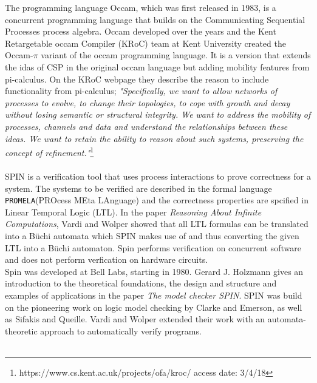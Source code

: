 \documentclass[a4paper]{report}
\begin{document}
The programming language Occam, which was first released in 1983, is a concurrent programming language that builds on the Communicating Sequential Processes process algebra. Occam developed over the years and the Kent Retargetable occam Compiler (KRoC) team at Kent University created the Occam-$\pi$ variant of the occam programming language. It is a version that extends the idas of CSP in the original occam language but adding mobility features from pi-calculus. On the KRoC webpage they describe the reason to include functionality from pi-calculus; \textit{"Specifically, we want to allow networks of processes to evolve, to change their topologies, to cope with growth and decay without losing semantic or structural integrity. We want to address the mobility of processes, channels and data and understand the relationships between these ideas. We want to retain the ability to reason about such systems, preserving the concept of refinement."}\footnote{https://www.cs.kent.ac.uk/projects/ofa/kroc/ access date: 3/4/18}\\\\

SPIN\cite{spin} is a verification tool that uses process interactions to prove correctness for a system. The systems to be verified are described in the formal language \texttt{PROMELA}(PROcess MEta LAnguage)\cite{Holzmann1991} and the correctness properties are spcified in Linear Temporal Logic (LTL)\cite{Pnueli1977}. In the paper \textit{Reasoning About Infinite Computations}\cite{Vardi1994}, Vardi and Wolper showed that all LTL formulas can be translated into a B\"uchi automata which SPIN makes use of and thus converting the given LTL into a B\"uchi automaton. Spin performs verification on concurrent software and does not perform verfication on hardware circuits. \\
Spin was developed at Bell Labs, starting in 1980. Gerard J. Holzmann gives an introduction to the theoretical foundations, the design and structure and examples of applications in the paper \textit{The model checker SPIN}\cite{Holzmann1997}. SPIN was build on the pioneering work on logic model checking by Clarke and Emerson\cite{Clarke1981}, as well as Sifakis and Queille\cite{Queille1982}. Vardi and Wolper extended their work with an automata-theoretic approach to automatically verify programs\cite{Vardi1986}.\\\\
\end{document}
